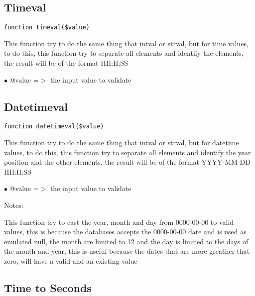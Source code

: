 \documentclass[a4paper]{book}
\begin{document}
\hypertarget{toc76}{}
\subsection{Timeval}

\begin{lstlisting}
function timeval($value)
\end{lstlisting}

This function try to do the same thing that intval or strval, but for time
values, to do this, this function try to separate all elements and identify
the elements, the result will be of the format HH:II:SS

\begin{compactitem}
\item[\color{myblue}$\bullet$] @value =$>$ the input value to validate
\end{compactitem}

\hypertarget{toc77}{}
\subsection{Datetimeval}

\begin{lstlisting}
function datetimeval($value)
\end{lstlisting}

This function try to do the same thing that intval or strval, but for datetime
values, to do this, this function try to separate all elements and identify
the year position and the other elements, the result will be of the format
YYYY-MM-DD HH:II:SS

\begin{compactitem}
\item[\color{myblue}$\bullet$] @value =$>$ the input value to validate
\end{compactitem}

Notes:

This function try to cast the year, month and day from 0000-00-00 to valid
values, this is because the databases accepts the 0000-00-00 date and is used
as emulated null, the month are limited to 12 and the day is limited to the
days of the month and year, this is useful because the dates that are more
greather that zero, will have a valid and an existing value

\hypertarget{toc78}{}
\subsection{Time to Seconds}
\end{document}
